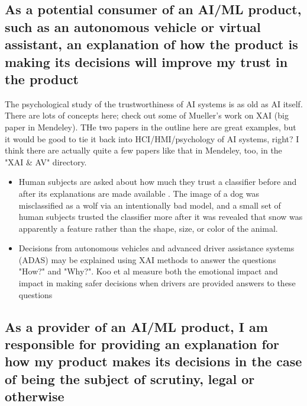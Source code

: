 \subsection{As a potential consumer of an AI/ML product, such as an autonomous vehicle or virtual assistant, an explanation of how the product is making its decisions will improve my trust in the product}

The psychological study of the trustworthiness of AI systems is as old as AI itself.  There are lots of concepts here; check out some of Mueller's work on XAI (big paper in Mendeley).  THe two papers in the outline here are great examples, but it would be good to tie it back into HCI/HMI/psychology of AI systems, right?  I think there are actually quite a few papers like that in Mendeley, too, in the "XAI \& AV" directory.

\begin{itemize}
    \item Human subjects are asked about how much they trust a classifier before and after its explanations are made available \cite{Ribeiro:2016:WIT:2939672.2939778}.  The image of a dog was misclassified as a wolf via an intentionally bad model, and a small set of human subjects trusted the classifier more after it was revealed that snow was apparently a feature rather than the shape, size, or color of the animal.
    \item Decisions from autonomous vehicles and advanced driver assistance systems (ADAS) may be explained using XAI methods to answer the questions "How?" and "Why?".  Koo et al measure both the emotional impact and impact in making safer decisions when drivers are provided answers to these questions \cite{Koo2015}
\end{itemize}

\subsection{As a provider of an AI/ML product, I am responsible for providing an explanation for how my product makes its decisions in the case of being the subject of scrutiny, legal or otherwise}

